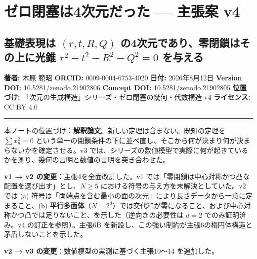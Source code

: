 \documentclass[
  10pt,
]{ltjsarticle}
\author{}
\date{}
\begin{document}
{
\setcounter{tocdepth}{3}
\tableofcontents
}
\section{ゼロ閉塞は4次元だった --- 主張案
v4}\label{ux30bcux30edux9589ux585eux306f4ux6b21ux5143ux3060ux3063ux305f-ux4e3bux5f35ux6848-v4}

\subsection{\texorpdfstring{基礎表現は \((r,t,R,Q)\)
の4次元であり、零閉鎖はその上に光錐 \(r^2-t^2-R^2-Q^2=0\)
を与える}{基礎表現は (r,t,R,Q) の4次元であり、零閉鎖はその上に光錐 r\^{}2-t\^{}2-R\^{}2-Q\^{}2=0 を与える}}\label{ux57faux790eux8868ux73feux306f-rtrq-ux306e4ux6b21ux5143ux3067ux3042ux308aux96f6ux9589ux9396ux306fux305dux306eux4e0aux306bux5149ux9310-r2-t2-r2-q20-ux3092ux4e0eux3048ux308b}

\textbf{著者:} 木原 範昭 \textbf{ORCID:} 0009-0004-6753-4020
\textbf{日付:} 2026年8月12日 \textbf{Version DOI:}
10.5281/zenodo.21902806 \textbf{Concept DOI:} 10.5281/zenodo.21902805
\textbf{位置づけ:} 「次元の生成構造」シリーズ・ゼロ閉塞の幾何・代数構造
v4 \textbf{ライセンス:} CC BY 4.0

\begin{center}\rule{0.5\linewidth}{0.5pt}\end{center}

本ノートの位置づけ：\textbf{解釈論文}。新しい定理は含まない。既知の定理を
\(\sum x_n^2 = 0\)
という単一の閉鎖条件の下に並べ直し、そこから何が決まり何が決まらないかを確定させる。v3
では、シリーズの数値模型で実際に何が起きているかを測り、幾何の言明と数値の言明を突き合わせた。

\textbf{v1 → v2 の変更}：主張4を全面改訂した。v1
では「零閉鎖は中心対称かつ凸な配置を選び出す」とし、\(N\ge5\)
における符号の与え方を未解決としていた。v2 では (a)
符号は「両端点を含む最小の面の次元」により長さデータから一意に定まること、(b)
\textbf{平行多面体}（\(N=2^d\)）では交代和が零になること、および中心対称かつ凸では足りないこと、を示した（逆向きの必要性は
\(d=2\) でのみ証明済み。v4 の訂正を参照）。主張6B
を新設し、この強い制約が主張6の楕円体構造と矛盾しないことを示した。

\textbf{v2 → v3 の変更}：数値模型の実測に基づく主張10〜14 を追加した。
\end{document}
